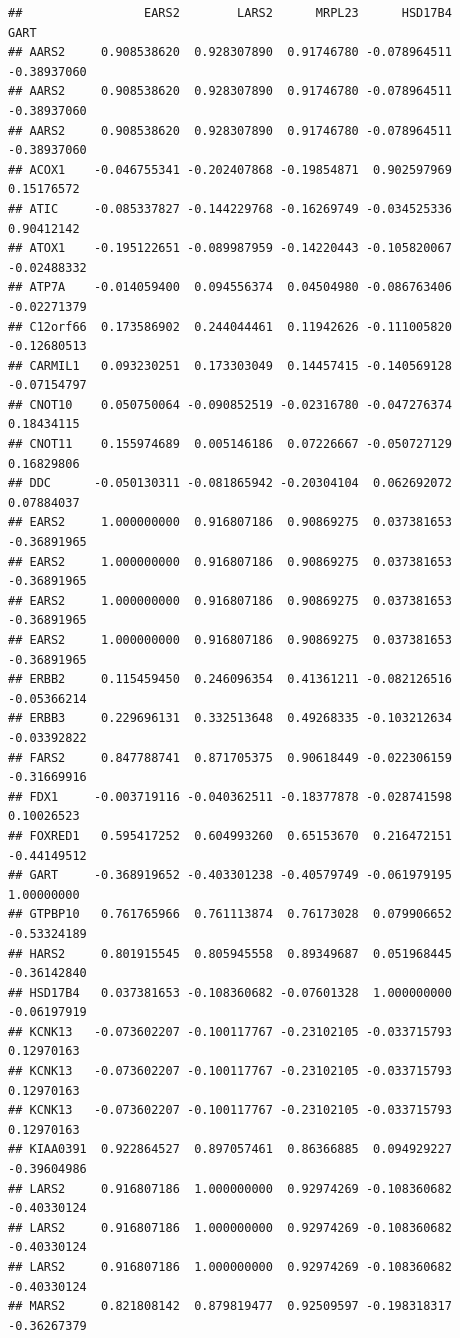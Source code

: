 \documentclass[
]{article}
\begin{document}
\begin{verbatim}
##                 EARS2        LARS2      MRPL23      HSD17B4        GART
## AARS2     0.908538620  0.928307890  0.91746780 -0.078964511 -0.38937060
## AARS2     0.908538620  0.928307890  0.91746780 -0.078964511 -0.38937060
## AARS2     0.908538620  0.928307890  0.91746780 -0.078964511 -0.38937060
## ACOX1    -0.046755341 -0.202407868 -0.19854871  0.902597969  0.15176572
## ATIC     -0.085337827 -0.144229768 -0.16269749 -0.034525336  0.90412142
## ATOX1    -0.195122651 -0.089987959 -0.14220443 -0.105820067 -0.02488332
## ATP7A    -0.014059400  0.094556374  0.04504980 -0.086763406 -0.02271379
## C12orf66  0.173586902  0.244044461  0.11942626 -0.111005820 -0.12680513
## CARMIL1   0.093230251  0.173303049  0.14457415 -0.140569128 -0.07154797
## CNOT10    0.050750064 -0.090852519 -0.02316780 -0.047276374  0.18434115
## CNOT11    0.155974689  0.005146186  0.07226667 -0.050727129  0.16829806
## DDC      -0.050130311 -0.081865942 -0.20304104  0.062692072  0.07884037
## EARS2     1.000000000  0.916807186  0.90869275  0.037381653 -0.36891965
## EARS2     1.000000000  0.916807186  0.90869275  0.037381653 -0.36891965
## EARS2     1.000000000  0.916807186  0.90869275  0.037381653 -0.36891965
## EARS2     1.000000000  0.916807186  0.90869275  0.037381653 -0.36891965
## ERBB2     0.115459450  0.246096354  0.41361211 -0.082126516 -0.05366214
## ERBB3     0.229696131  0.332513648  0.49268335 -0.103212634 -0.03392822
## FARS2     0.847788741  0.871705375  0.90618449 -0.022306159 -0.31669916
## FDX1     -0.003719116 -0.040362511 -0.18377878 -0.028741598  0.10026523
## FOXRED1   0.595417252  0.604993260  0.65153670  0.216472151 -0.44149512
## GART     -0.368919652 -0.403301238 -0.40579749 -0.061979195  1.00000000
## GTPBP10   0.761765966  0.761113874  0.76173028  0.079906652 -0.53324189
## HARS2     0.801915545  0.805945558  0.89349687  0.051968445 -0.36142840
## HSD17B4   0.037381653 -0.108360682 -0.07601328  1.000000000 -0.06197919
## KCNK13   -0.073602207 -0.100117767 -0.23102105 -0.033715793  0.12970163
## KCNK13   -0.073602207 -0.100117767 -0.23102105 -0.033715793  0.12970163
## KCNK13   -0.073602207 -0.100117767 -0.23102105 -0.033715793  0.12970163
## KIAA0391  0.922864527  0.897057461  0.86366885  0.094929227 -0.39604986
## LARS2     0.916807186  1.000000000  0.92974269 -0.108360682 -0.40330124
## LARS2     0.916807186  1.000000000  0.92974269 -0.108360682 -0.40330124
## LARS2     0.916807186  1.000000000  0.92974269 -0.108360682 -0.40330124
## MARS2     0.821808142  0.879819477  0.92509597 -0.198318317 -0.36267379

\end{verbatim}
\end{document}
